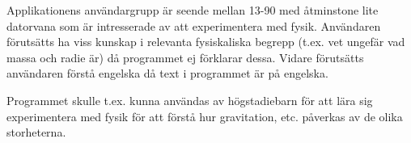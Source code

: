 Applikationens användargrupp är seende mellan 13-90 med åtminstone
lite datorvana som är intresserade av att experimentera med fysik.
Användaren förutsätts ha viss kunskap i relevanta fysiskaliska
begrepp (t.ex. vet ungefär vad massa och radie är) då programmet
ej förklarar dessa. Vidare förutsätts användaren förstå engelska
då text i programmet är på engelska.

Programmet skulle t.ex. kunna användas av högstadiebarn för att lära sig
experimentera med fysik för att förstå hur gravitation, etc. påverkas
av de olika storheterna.

